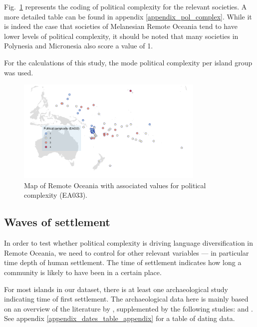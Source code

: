 \documentclass[12pt,letterpaper]{article}
\begin{document}
Fig.~\ref{appendix_pol_complex_map} represents the coding of political complexity for the relevant societies. A more detailed table can be found in appendix \ref{appendix_pol_complex}. While it is indeed the case that societies of Melanesian Remote Oceania tend to have lower levels of political complexity, it should be noted that many societies in Polynesia and Micronesia also score a value of 1.

For the calculations of this study, the mode political complexity per island group was used. 

\begin{figure}
\centering
\includegraphics[width=0.8\textwidth]{map_pol_complex}
\caption[Map of Remote Oceania: Political complexity]{{Map of Remote Oceania with associated values for political complexity (EA033).}}
\label{appendix_pol_complex_map}
\end{figure}


\FloatBarrier
\subsection{Waves of settlement}
\label{appendix_def_dates}
In order to test whether political complexity is driving language diversification in Remote Oceania, we need to control for other relevant variables --- in particular time depth of human settlement. The time of settlement indicates how long a community is likely to have been in a certain place. 

For most islands in our dataset, there is at least one archaeological study indicating time of first settlement. The archaeological data here is mainly based on an overview of the literature by \citet{rieth_cochrane_2018}, supplemented by the following studies: \citet{intoh2007reconnaissance, intoh2008ongoing, carson2012recent, kirch2012basline, Napolitano_et_al_yap, ellis2012saipan} and \citet{levin_seikel_miles_2019}. See appendix \ref{appendix_dates_table_appendix} for a table of dating data.
\end{document}
